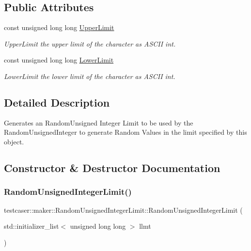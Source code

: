 \subsection*{Public Attributes}
\begin{DoxyCompactItemize}
\item 
const unsigned long long \mbox{\hyperlink{classtestcaser_1_1maker_1_1RandomUnsignedIntegerLimit_a02335f6ed09e057b47b5c40b584c71fe}{Upper\+Limit}}
\begin{DoxyCompactList}\small\item\em Upper\+Limit the upper limit of the character as A\+S\+C\+II int. \end{DoxyCompactList}\item 
const unsigned long long \mbox{\hyperlink{classtestcaser_1_1maker_1_1RandomUnsignedIntegerLimit_a78c820c6fa2a1e136a71141f5697ff7f}{Lower\+Limit}}
\begin{DoxyCompactList}\small\item\em Lower\+Limit the lower limit of the character as A\+S\+C\+II int. \end{DoxyCompactList}\end{DoxyCompactItemize}


\subsection{Detailed Description}
Generates an Random\+Unsigned Integer Limit to be used by the Random\+Unsigned\+Integer to generate Random Values in the limit specified by this object. 



\subsection{Constructor \& Destructor Documentation}
\mbox{\label{classtestcaser_1_1maker_1_1RandomUnsignedIntegerLimit_a8535b952828f59d17c69caae62f4c4e1}} 
\subsubsection{\texorpdfstring{RandomUnsignedIntegerLimit()}{RandomUnsignedIntegerLimit()}\hspace{0.1cm}{\footnotesize\ttfamily [1/2]}}
{\footnotesize\ttfamily testcaser\+::maker\+::\+Random\+Unsigned\+Integer\+Limit\+::\+Random\+Unsigned\+Integer\+Limit (\begin{DoxyParamCaption}\item[{std\+::initializer\+\_\+list$<$ unsigned long long $>$}]{llmt }\end{DoxyParamCaption})\hspace{0.3cm}{\ttfamily [inline]}}



